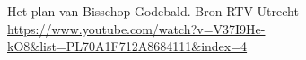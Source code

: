 Het plan van Bisschop Godebald. Bron RTV Utrecht \url{https://www.youtube.com/watch?v=V37I9He-kO8&list=PL70A1F712A8684111&index=4}